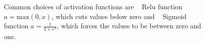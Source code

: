 \begin{figure}
\centering
{}
\caption{Common choices of activation functions are ~ Relu function $a=\mathrm{max}(0,x)$, which cuts values below zero and ~ Sigmoid function $a=\frac{1}{1+e^{x}}$, which forces the values to be between zero and one.}
\label{fig:activation}
\end{figure}
